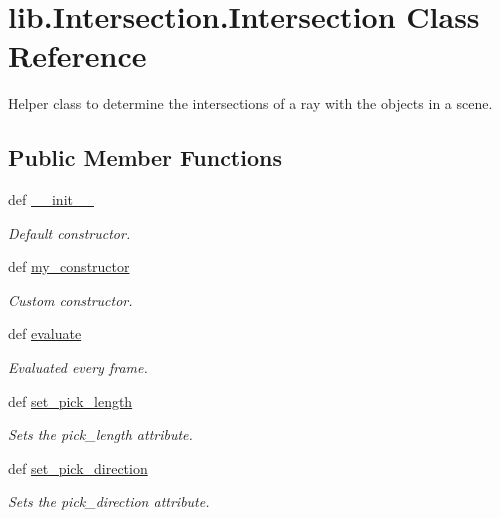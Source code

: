 \hypertarget{classlib_1_1Intersection_1_1Intersection}{\section{lib.\-Intersection.\-Intersection \-Class \-Reference}
\label{classlib_1_1Intersection_1_1Intersection}
}


\-Helper class to determine the intersections of a ray with the objects in a scene.  


\subsection*{\-Public \-Member \-Functions}
\begin{DoxyCompactItemize}
\item 
def \hyperlink{classlib_1_1Intersection_1_1Intersection_a5a33b5d25908f77536156171000b5b58}{\-\_\-\-\_\-init\-\_\-\-\_\-}
\begin{DoxyCompactList}\small\item\em \-Default constructor. \end{DoxyCompactList}\item 
def \hyperlink{classlib_1_1Intersection_1_1Intersection_a24cc43ce37b5817cb4d4eacc9db26a39}{my\-\_\-constructor}
\begin{DoxyCompactList}\small\item\em \-Custom constructor. \end{DoxyCompactList}\item 
def \hyperlink{classlib_1_1Intersection_1_1Intersection_aa27b7b10a0e211405cf19b6e05a95281}{evaluate}
\begin{DoxyCompactList}\small\item\em \-Evaluated every frame. \end{DoxyCompactList}\item 
def \hyperlink{classlib_1_1Intersection_1_1Intersection_a9e31ec3d9251db71c8e2b66d91c23346}{set\-\_\-pick\-\_\-length}
\begin{DoxyCompactList}\small\item\em \-Sets the pick\-\_\-length attribute. \end{DoxyCompactList}\item 
def \hyperlink{classlib_1_1Intersection_1_1Intersection_afe08bc90d7c6dc806d67a0fe9be12e67}{set\-\_\-pick\-\_\-direction}
\begin{DoxyCompactList}\small\item\em \-Sets the pick\-\_\-direction attribute. \end{DoxyCompactList}\item 

\end{DoxyCompactItemize}
